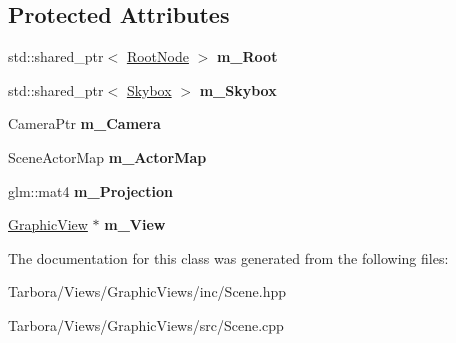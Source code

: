 \subsection*{Protected Attributes}
\begin{DoxyCompactItemize}
\item 
\mbox{\label{classTarbora_1_1Scene_aabd1a11a2b8bb7aedc3915e135c19f7a}} 
std\+::shared\+\_\+ptr$<$ \hyperlink{classTarbora_1_1RootNode}{Root\+Node} $>$ {\bfseries m\+\_\+\+Root}
\item 
\mbox{\label{classTarbora_1_1Scene_ae4478ba18d9243358a7449a31b932143}} 
std\+::shared\+\_\+ptr$<$ \hyperlink{classTarbora_1_1Skybox}{Skybox} $>$ {\bfseries m\+\_\+\+Skybox}
\item 
\mbox{\label{classTarbora_1_1Scene_ab40b861574f5e22c2af86c83bffff312}} 
Camera\+Ptr {\bfseries m\+\_\+\+Camera}
\item 
\mbox{\label{classTarbora_1_1Scene_a2c08743f2a7414c748a5335274203e82}} 
Scene\+Actor\+Map {\bfseries m\+\_\+\+Actor\+Map}
\item 
\mbox{\label{classTarbora_1_1Scene_ab62af3e98c2ae7d0d5354de05fbc824e}} 
glm\+::mat4 {\bfseries m\+\_\+\+Projection}
\item 
\mbox{\label{classTarbora_1_1Scene_a33a04f0999fc7585043461fa3effa8e4}} 
\hyperlink{classTarbora_1_1GraphicView}{Graphic\+View} $\ast$ {\bfseries m\+\_\+\+View}
\end{DoxyCompactItemize}


The documentation for this class was generated from the following files\+:\begin{DoxyCompactItemize}
\item 
Tarbora/\+Views/\+Graphic\+Views/inc/Scene.\+hpp\item 
Tarbora/\+Views/\+Graphic\+Views/src/Scene.\+cpp\end{DoxyCompactItemize}
